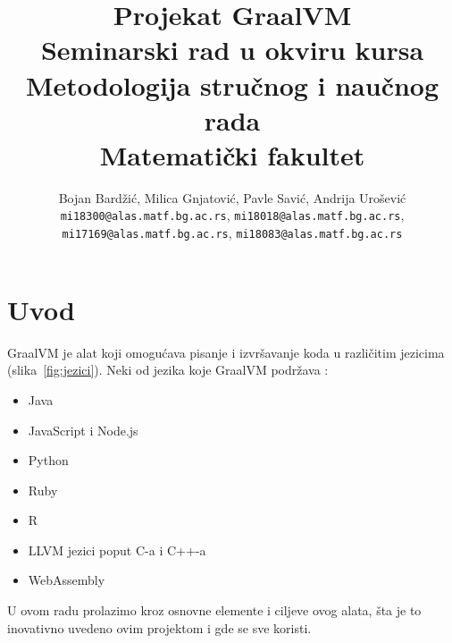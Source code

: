 \documentclass[a4paper]{article}
\begin{document}
\title{Projekat GraalVM\\ \small{Seminarski rad u okviru kursa\\Metodologija stručnog i naučnog rada\\ Matematički fakultet}}

\author{Bojan Bardžić, Milica Gnjatović, Pavle Savić, Andrija Urošević\\ 
	\texttt{mi18300@alas.matf.bg.ac.rs}, 
	\texttt{mi18018@alas.matf.bg.ac.rs}, \\ 
	\texttt{mi17169@alas.matf.bg.ac.rs}, 
	\texttt{mi18083@alas.matf.bg.ac.rs}}


\maketitle


\tableofcontents

\newpage

\section{Uvod}
\label{sec:uvod}
GraalVM je alat koji omogućava pisanje i izvršavanje koda u različitim jezicima (slika~\ref{fig:jezici}). Neki od jezika koje GraalVM podržava \cite{graalvm}: 
\begin{itemize}
	\item Java
	\item JavaScript i Node.js
	\item Python
	\item Ruby
	\item R
	\item LLVM jezici poput C-a i C++-a
	\item WebAssembly\\
\end{itemize}

U ovom radu prolazimo kroz osnovne elemente i ciljeve ovog alata, šta je to inovativno uvedeno ovim projektom i gde se sve koristi. 
\end{document}

